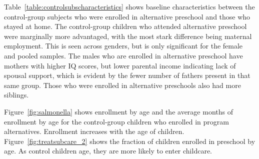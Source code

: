 Table~\ref{table:controlsubscharacteristics} shows baseline characteristics between the control-group subjects who were enrolled in alternative preschool and those who stayed at home. The control-group children who attended alternative preschool were marginally more advantaged, with the most stark difference being maternal employment. This is seen across genders, but is only significant for the female and pooled samples. The males who are enrolled in alternative preschool have mothers with higher IQ scores, but lower parental income indicating lack of spousal support, which is evident by the fewer number of fathers present in that same group. Those who were enrolled in alternative preschools also had more siblings.

Figure~\ref{fig:salmonella} shows enrollment by age and the average months of enrollment by age for the control-group children who enrolled in program alternatives. Enrollment increases with the age of children. Figure~\ref{fig:treatsubcare_2} shows the fraction of children enrolled in preschool by age. As control children age, they are more likely to enter childcare.

